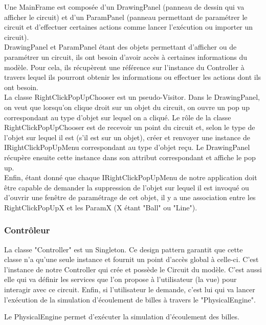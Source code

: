 \documentclass{report}
\begin{document}
Une MainFrame est composée d'un DrawingPanel (panneau de dessin qui va afficher le circuit) et d'un ParamPanel (panneau permettant de paramétrer le circuit et d'effectuer certaines actions comme lancer l'exécution ou importer un circuit). \\

DrawingPanel et ParamPanel étant des objets permettant d'afficher ou de paramétrer un circuit, ils ont besoin d'avoir accès à certaines informations du modèle. Pour cela, ils récupèrent une référence sur l'instance du Controller à travers lequel ils pourront obtenir les informations ou effectuer les actions dont ils ont besoin. \\

La classe RightClickPopUpChooser est un pseudo-Visitor. Dans le DrawingPanel, on veut que lorsqu'on clique droit sur un objet du circuit, on ouvre un pop up correspondant au type d'objet sur lequel on a cliqué. Le rôle de la classe RightClickPopUpChooser est de recevoir un point du circuit et, selon le type de l'objet sur lequel il est (s'il est sur un objet), créer et renvoyer une instance de  IRightClickPopUpMenu correspondant au type d'objet reçu. Le DrawingPanel récupère ensuite cette instance dans son attribut correspondant et affiche le pop up. \\

Enfin, étant donné que chaque IRightClickPopUpMenu de notre application doit être capable de demander la suppression de l'objet sur lequel il est invoqué ou d'ouvrir une fenêtre de paramétrage de cet objet, il y a une association entre les RightClickPopUpX et les ParamX (X étant "Ball" ou "Line").

\subsubsection{Contrôleur}

La classe "Controller" est un Singleton. Ce design pattern garantit que cette classe n'a qu'une seule instance et fournit un point d'accès global à celle-ci. C'est l'instance de notre Controller qui crée et possède le Circuit du modèle. C'est aussi elle qui va définir les services que l'on propose à l'utilisateur (la vue) pour interagir avec ce circuit. Enfin, si l'utilisateur le demande, c'est lui qui va lancer l'exécution de la simulation d'écoulement de billes à travers le "PhysicalEngine".

Le PhysicalEngine permet d'exécuter la simulation d'écoulement des billes.
\end{document}
